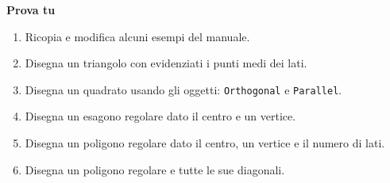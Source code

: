 \textbf{Prova tu}
\begin{enumerate} [noitemsep]
\item Ricopia e modifica alcuni esempi del manuale.
\item Disegna un triangolo con evidenziati i punti medi dei lati.
\item Disegna un quadrato usando gli oggetti: \texttt{Orthogonal} e 
 \texttt{Parallel}.
\item Disegna un esagono regolare dato il centro e un vertice.
\item Disegna un poligono regolare dato il centro, un vertice e il numero di 
 lati.
\item Disegna un poligono regolare e tutte le sue diagonali.
\end{enumerate}
